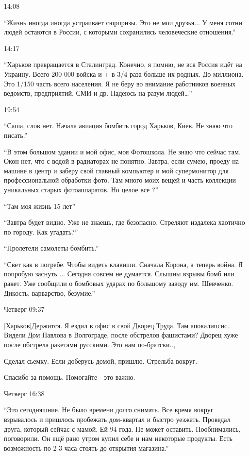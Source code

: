 14:08

\enquote{Жизнь иногда иногда устраивает сюрпризы. Это не мои друзья... У меня сотни людей
остаются в России, с которыми сохранились человеческие отношения.}

14:17

\enquote{Харьков превращается в Сталинград. Конечно, я помню, не вся Россия идёт на
Украину. Всего 200 000 войска и + в 3/4 раза больше их родных. До миллиона.
Это 1/150 часть всего населения. Я не беру во внимание работников военных
ведомств, предприятий, СМИ и др. Надеюсь на разум людей…}


19:54

\enquote{Саша, слов нет. Начала авиация бомбить город Харьков, Киев. Не знаю что писать.}

\enquote{В этом большом здании и мой офис, моя Фотошкола. Не знаю что сейчас там. Окон
нет, что с водой в радиаторах не понятно. Завтра, если сумею, проеду на машине
в центр и заберу свой главный компьютер и мой супермонитор для профессиональной
обработки фото. Там много моих вещей и часть коллекции уникальных старых
фотоаппаратов. Но целое все ?}

\enquote{Там моя жизнь 15 лет}

\enquote{Завтра будет видно. Уже не знаешь, где безопасно. Стреляют издалека хаотично по городу. Как угадать?}

\enquote{Пролетели самолеты бомбить.}

\enquote{Свет как в погребе. Чтобы видеть клавиши. Сначала Корона, а теперь война.  Я
попробую заснуть ... Сегодня совсем не думается. Слышны взрывы бомб или ракет.
Уже сообщили о бомбовых ударах по большому заводу им. Шевченко. Дикость,
варварство, безумие.}

Четверг 09:37

[Харьков]Держится. Я ездил в офис в свой Дворец Труда. Там апокалипсис. Видели
Дом Павлова в Волгограде, после обстрелов фашистами? Дворец хуже после обстрела
ракетами русскими. Это нам по-братски..,

Сделал сьемку. Если доберусь домой, пришлю. Стрельба вокруг.

Спасибо за помощь. Помогайте - это важно.

Четверг 16:38

\enquote{Это сегодняшние. Не было времени долго снимать. Все время вокруг взрывалось и
пришлось пробежать дом-квартал и быстро уезжать. Проведал друга, который
сейчас с мамой. Ей 94 года. Не может оставить. Пообнимались, поговорили. Он ещё
рано утром купил себе и нам некоторые продукты. Есть возможность по 2-3 часа
стоять до открытия магазина.}

